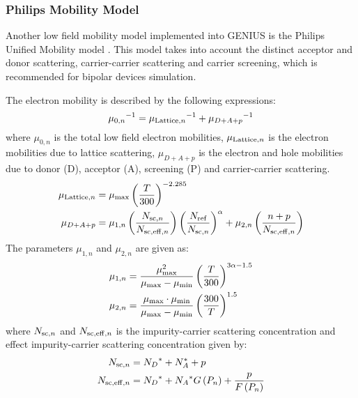 \documentclass[oneside,12pt]{cgd_book}
\begin{document}
\subsubsection[sec:Equation:Mobility:Bulk:Philips]{Philips Mobility Model}
\label{mobility+Philips model}Another low field mobility model implemented into GENIUS is the Philips Unified Mobility model
\cite{Klaassen1992-1,Klaassen1992-2}. This model takes into account the
          distinct acceptor and donor scattering, carrier-carrier scattering and carrier screening, which is recommended
          for bipolar devices simulation.
\par
The electron mobility is described by the following expressions:
\begin{equation}
{\mu_{0,n}}^{-1} = {\mu_{{\rm Lattice},n}}^{-1} + {\mu _{D + A + p}}^{-1}
\end{equation}
where $\mu_{0,n}$ is the total low field electron mobilities, $\mu_{{\rm Lattice},n}$
is the electron mobilities due to lattice scattering, $\mu_{D + A + p}$
is the electron and hole mobilities due to donor (D), acceptor (A),
          screening (P) and carrier-carrier scattering.
\begin{align}
\mu_{{\rm Lattice},n}&=\mu_{\rm max} \left( \frac{T}{300} \right)^{-2.285}\\
\mu _{D + A + p} &= \mu_{1,n} \left( \frac{N_{{\rm sc,}n}}{N_{{\rm sc,eff,}n}} \right) \left(
            \frac{N_{\rm ref}}{N_{{\rm sc,}n} } \right)^\alpha + \mu_{2,n} \left( \frac{n + p}{N_{{\rm sc,eff,}n}}
            \right)
\end{align}
The parameters $\mu_{1,n}$ and $\mu_{2,n}$ are
          given as:
\begin{subequations}
\begin{align}
 \mu_{1,n}  &= \frac{ \mu_{\rm max }^2 }{ \mu_{\rm max } - \mu_{\rm min } }
            \left(\frac{T}{300} \right)^{3\alpha - 1.5}\\
 \mu_{2,n}  &= \frac{ \mu_{\rm max } \cdot \mu_{\rm min } }{ \mu_{\rm max } - \mu_{\rm min}
            } \left( \frac{300}{T} \right)^{1.5}
\end{align}
\end{subequations}
where ${N_{{\rm sc,}n} }$ and ${N_{{\rm
          sc,eff,}n}}$ is the impurity-carrier scattering concentration and effect impurity-carrier scattering
          concentration given by:
\begin{subequations}
\begin{align}
N_{{\rm sc,}n} &= {N_D}^* + N_A^* + p\\
N_{{\rm sc,eff,}n} &= {N_D}^* + {N_A}^* G\left( {P_n } \right) + \frac{p}{ F\left( {P_n } \right)
            }
\end{align}
\end{subequations}
\end{document}
